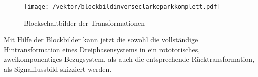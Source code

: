 \begin{figure}[h]
	\centering
	\texttt{[image: /vektor/blockbildinverseclarkeparkkomplett.pdf]}
	\label{fig:blockbildinverseclarkeparkkomplett}
	\caption{Blockschaltbilder der Transformationen}
\end{figure}

Mit Hilfe der Blockbilder kann jetzt die sowohl die vollständige Hintransformation eines Dreiphasensystems in ein rototorisches, zweikomponentiges Bezugsystem, als auch die entsprechende Rücktransformation, als Signalflussbild skizziert werden.





 
